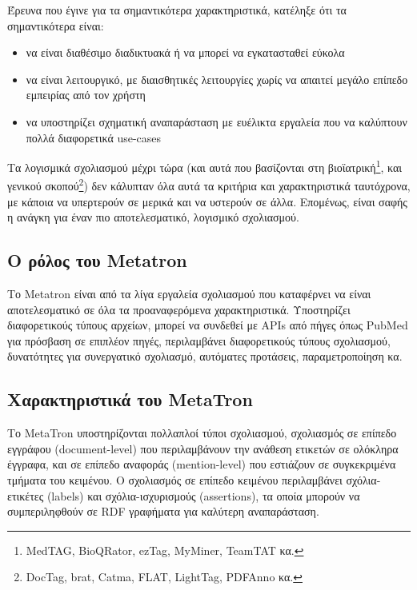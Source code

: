             Έρευνα \cite{ManualAnnotating} που έγινε για τα σημαντικότερα χαρακτηριστικά, κατέληξε ότι τα σημαντικότερα είναι:
            \vspace{-10pt}
            \begin{itemize}[label={\tiny \blacksquare}]
                \item να είναι διαθέσιμο διαδικτυακά ή να μπορεί να εγκατασταθεί εύκολα
                \vspace{-7pt}
                \item να είναι λειτουργικό, με διαισθητικές λειτουργίες χωρίς να απαιτεί μεγάλο επίπεδο εμπειρίας από τον χρήστη
                \vspace{-7pt}
                \item να υποστηρίζει σχηματική αναπαράσταση με ευέλικτα εργαλεία που να καλύπτουν πολλά διαφορετικά use-cases
            \end{itemize}
            \vspace{-10pt}

            Τα λογισμικά σχολιασμού μέχρι τώρα (και αυτά που βασίζονται στη βιοϊατρική\footnote{MedTAG, BioQRator, ezTag, MyMiner, TeamTAT κα.}, και γενικού σκοπού\footnote{DocTag, brat, Catma, FLAT, LightTag, PDFAnno κα.}) δεν κάλυπταν όλα αυτά τα κριτήρια και χαρακτηριστικά ταυτόχρονα, με κάποια να υπερτερούν σε μερικά και να υστερούν σε άλλα.
            Επομένως, είναι σαφής η ανάγκη για έναν πιο αποτελεσματικό, λογισμικό σχολιασμού.


    \subsection{Ο ρόλος του Metatron}
        Το Metatron είναι από τα λίγα εργαλεία σχολιασμού που καταφέρνει να είναι αποτελεσματικό σε όλα τα προαναφερόμενα χαρακτηριστικά.
        Υποστηρίζει διαφορετικούς τύπους αρχείων, μπορεί να συνδεθεί με APIs από πήγες όπως PubMed για πρόσβαση σε επιπλέον πηγές, περιλαμβάνει διαφορετικούς τύπους σχολιασμού, δυνατότητες για συνεργατικό σχολιασμό, αυτόματες προτάσεις, παραμετροποίηση κα.

    \subsection{Χαρακτηριστικά του MetaTron}
        Το MetaTron υποστηρίζονται πολλαπλοί τύποι σχολιασμού, σχολιασμός σε επίπεδο εγγράφου (document-level) που περιλαμβάνουν την ανάθεση ετικετών σε ολόκληρα έγγραφα, και σε επίπεδο αναφοράς (mention-level) που εστιάζουν σε συγκεκριμένα τμήματα του κειμένου.
        Ο σχολιασμός σε επίπεδο κειμένου περιλαμβάνει σχόλια-ετικέτες (labels) και σχόλια-ισχυρισμούς (assertions), τα οποία μπορούν να συμπεριληφθούν σε RDF γραφήματα για καλύτερη αναπαράσταση.

